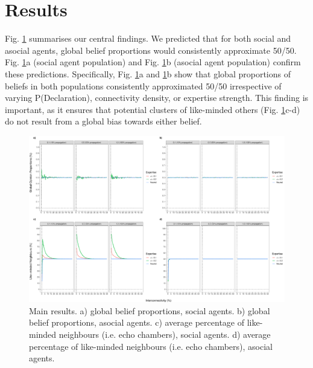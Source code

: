 \documentclass[fleqn,10pt]{wlscirep}
\begin{document}
\section*{Results}

Fig. \ref{fig:results} summarises our central findings. We predicted that for both social and asocial agents, global belief proportions would consistently approximate 50/50. Fig. \ref{fig:results}a (social agent population) and Fig. \ref{fig:results}b (asocial agent population) confirm these predictions. Specifically, Fig.  \ref{fig:results}a and \ref{fig:results}b show that global proportions of beliefs in both populations consistently approximated 50/50 irrespective of varying P(Declaration), connectivity density, or expertise strength. This finding is important, as it ensures that potential clusters of like-minded others (Fig. \ref{fig:results}c-d) do not result from a global bias towards either belief.

\begin{figure}[ht]
\centering
\includegraphics[width=1\columnwidth]{figure2.pdf}
\caption{Main results. a) global belief proportions, social agents. b) global belief proportions, asocial agents. c) average percentage of like-minded neighbours (i.e. echo chambers), social agents. d) average percentage of like-minded neighbours (i.e. echo chambers), asocial agents.}
\label{fig:results}
\end{figure}
\end{document}
